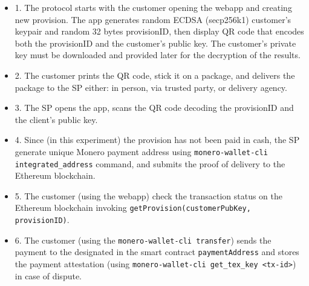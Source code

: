 \documentclass{ieeeaccess}
\begin{document}
\begin{itemize}
  \item 1. The protocol starts with the customer opening the webapp and creating new provision. 
The app generates random ECDSA (secp256k1) customer's keypair and random 32 bytes provisionID, then display QR code that encodes both the provisionID and the customer's public key. 
The customer's private key must be downloaded and provided later for the decryption of the results.

  \item 2. The customer prints the QR code, stick it on a package, and delivers the package to the SP either: in person, via trusted party, or delivery agency.

  \item 3. The SP opens the app, scans the QR code decoding the provisionID and the client's public key.

  \item 4. Since (in this experiment) the provision has not been paid in cash, the SP generate unique Monero payment address using \texttt{monero-wallet-cli integrated\_address} command, and submits the proof of delivery to the Ethereum blockchain. 

  \item 5. The customer (using the webapp) check the transaction status on the Ethereum blockchain invoking \texttt{getProvision(customerPubKey, provisionID)}.

  \item 6. The customer (using the \texttt{monero-wallet-cli transfer}) sends the payment to the designated in the smart contract \texttt{paymentAddress} and stores the payment attestation (using \texttt{monero-wallet-cli get\_tex\_key <tx-id>}) in case of dispute.


\end{itemize}
\end{document}
